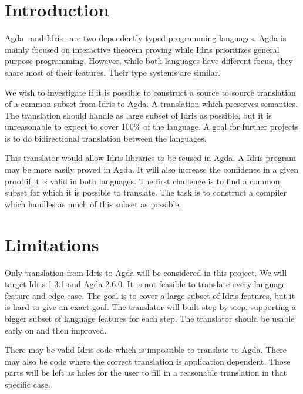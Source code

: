 \documentclass[parskip=half]{scrartcl}
\begin{document}


\section{Introduction}

Agda~\cite{agda} and Idris~\cite{idris} are two dependently typed programming
languages.  Agda is mainly focused on interactive theorem proving while Idris
prioritizes general purpose programming.  However, while both languages have
different focus, they share most of their features. Their type systems are
similar.



We wish to investigate if it is possible to construct a source to source
translation of a common subset from Idris to Agda. A translation which
preserves semantics. The translation should handle as large subset of Idris as
possible, but it is unreasonable to expect to cover 100\% of the language.
A goal for further projects is to do bidirectional translation between the
languages.

This translator would allow Idris libraries to be reused in Agda. A Idris
program may be more easily proved in Agda.  It will also increase the
confidence in a given proof if it is valid in both languages.  The first
challenge is to find a common subset for which it is possible to translate. The
task is to construct a compiler which handles as much of this subset as
possible.


\section{Limitations}
Only translation from Idris to Agda will be considered in this project. We will
target Idris 1.3.1 and Agda 2.6.0. It is not feasible to translate every
language feature and edge case.  The goal is to cover a large subset of Idris
features, but it is hard to give an exact goal.  The translator will built step
by step, supporting a bigger subset of language features for each step. The
translator should be usable early on and then improved.

There may be valid Idris code which is impossible to translate to Agda. There
may also be code where the correct translation is application dependent. Those
parts will be left as holes for the user to fill in a reasonable translation in
that specific case.
\end{document}
